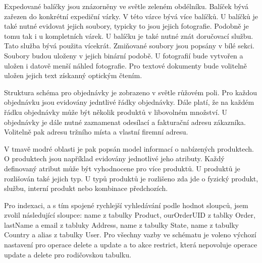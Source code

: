 \documentclass[thesis=B,czech]{FITthesis}[2012/06/26]
\begin{document}
	Expedované balíčky jsou znázorněny ve světle zeleném obdélníku. Balíček bývá zařezen do konkrétní expediční várky. V této várce bývá více balíčků. U balíčků je také nutné evidovat jejich soubory, typicky to jsou jejich fotografie. Podobně je tomu tak i u kompletních várek. U balíčku je také nutné znát doručovací službu. Tato služba bývá použita vícekrát. Zmiňované soubory jsou popsány v bílé sekci. Soubory budou uloženy v jejich binární podobě. U fotografií bude vytvořen a uložen i datově menší náhled fotografie. Pro textové dokumenty bude volitelně uložen jejich text získanný optickým čtením.

	Struktura schéma pro objednávky je zobrazeno v světle růžovém poli. Pro každou objednávku jsou evidovány jedntlivé řádky objednávky. Dále platí, že na každém řádku objednávky může být několik produktů v libovolném množství. U objednávky je dále nutné zaznamenat odesílací a fakturační adresu zákazníka. Volitelně pak adresu tržního místa a vlastní firemní adresu.
	
	V tmavě modré oblasti je pak popsán model informací o nabízených produktech. O produktech jsou například evidovány jednotlivé jeho atributy. Každý definovaný atribut může být vyhodnocene pro více produktů. U produktů je rozlišován také jejich typ. U typů produktů je rozlišeno zda jde o fyzický produkt, službu, interní produkt nebo kombinace předchozích.
	
	Pro indexaci, a s tím spojené rychlejší vyhledávání podle hodnot sloupců, jsem zvolil následující sloupce: name z tabulky Product, ourOrderUID z tablky Order, lastName a email z tabluky Address, name z tabulky State, name z tabulky Country a alias z tabulky User. Pro všechny vazby ve schématu je voleno výchozí nastavení pro operace delete a update a to akce restrict, která nepovoluje operace update a delete pro rodičovskou tabulku.
	
\end{document}
